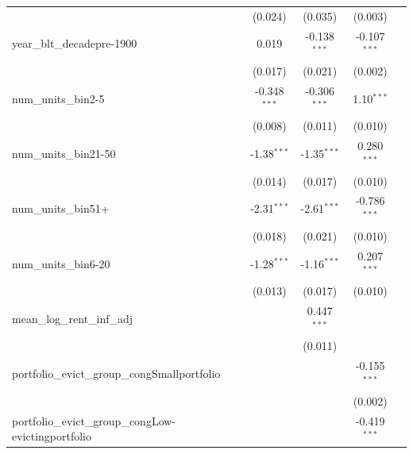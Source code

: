 \documentclass[
  11pt,
]{article}
\begin{document}
\begin{center}
{\begin{tabular}{lcccc}
                                                               & (0.024)        & (0.035)        & (0.003)        &   \\   
   year\_blt\_decadepre-1900                                   & 0.019          & -0.138$^{***}$ & -0.107$^{***}$ &   \\   
                                                               & (0.017)        & (0.021)        & (0.002)        &   \\   
   num\_units\_bin2-5                                          & -0.348$^{***}$ & -0.306$^{***}$ & 1.10$^{***}$   &   \\   
                                                               & (0.008)        & (0.011)        & (0.010)        &   \\   
   num\_units\_bin21-50                                        & -1.38$^{***}$  & -1.35$^{***}$  & 0.280$^{***}$  &   \\   
                                                               & (0.014)        & (0.017)        & (0.010)        &   \\   
   num\_units\_bin51+                                          & -2.31$^{***}$  & -2.61$^{***}$  & -0.786$^{***}$ &   \\   
                                                               & (0.018)        & (0.021)        & (0.010)        &   \\   
   num\_units\_bin6-20                                         & -1.28$^{***}$  & -1.16$^{***}$  & 0.207$^{***}$  &   \\   
                                                               & (0.013)        & (0.017)        & (0.010)        &   \\   
   mean\_log\_rent\_inf\_adj                                   &                & 0.447$^{***}$  &                &   \\   
                                                               &                & (0.011)        &                &   \\   
   portfolio\_evict\_group\_congSmallportfolio                 &                &                & -0.155$^{***}$ &   \\   
                                                               &                &                & (0.002)        &   \\   
   portfolio\_evict\_group\_congLow-evictingportfolio          &                &                & -0.419$^{***}$ &   \\   

\end{tabular}}
\end{center}
\end{document}
